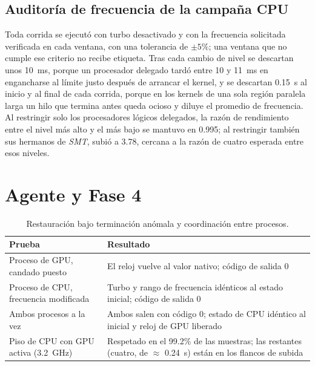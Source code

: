 \subsection{Auditoría de frecuencia de la campaña CPU}
\label{sec:auditoria-frecuencia-cpu}

Toda corrida se ejecutó con turbo desactivado y con la frecuencia solicitada verificada en cada ventana, con una tolerancia de $\pm5\%$; una ventana que no cumple ese criterio no recibe etiqueta. Tras cada cambio de nivel se descartan unos 10~ms, porque un procesador delegado tardó entre 10 y 11~ms en engancharse al límite justo después de arrancar el kernel, y se descartan 0.15~s al inicio y al final de cada corrida, porque en los kernels de una sola región paralela larga un hilo que termina antes queda ocioso y diluye el promedio de frecuencia. Al restringir solo los procesadores lógicos delegados, la razón de rendimiento entre el nivel más alto y el más bajo se mantuvo en 0.995; al restringir también sus hermanos de \textit{SMT}, subió a 3.78, cercana a la razón de cuatro esperada entre esos niveles.

\section{Agente y Fase 4}

\begin{table}[H]
\centering
\caption{Restauración bajo terminación anómala y coordinación entre procesos.}
\label{tab:agente-restauracion}
\small
\begin{tabular}{@{}>{\raggedright\arraybackslash}p{4.4cm}>{\raggedright\arraybackslash}p{8.4cm}@{}}
\toprule
\textbf{Prueba} & \textbf{Resultado} \\
\midrule
Proceso de GPU, candado puesto & El reloj vuelve al valor nativo; código de salida 0 \\
Proceso de CPU, frecuencia modificada & Turbo y rango de frecuencia idénticos al estado inicial; código de salida 0 \\
Ambos procesos a la vez & Ambos salen con código 0; estado de CPU idéntico al inicial y reloj de GPU liberado \\
Piso de CPU con GPU activa (3.2~GHz) & Respetado en el 99.2\% de las muestras; las restantes (cuatro, de $\approx$ 0.24~s) están en los flancos de subida \\
\bottomrule
\end{tabular}
\end{table}

